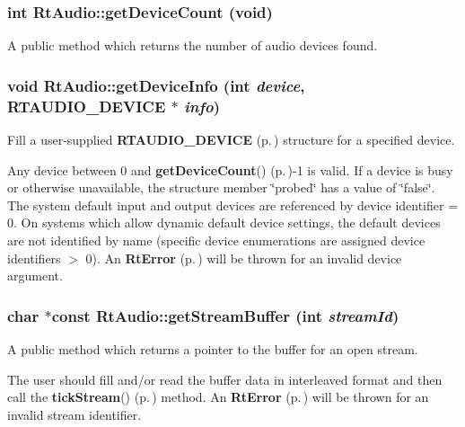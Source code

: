 \subsubsection{\setlength{\rightskip}{0pt plus 5cm}int Rt\-Audio::get\-Device\-Count (void)}\label{classRtAudio_a6}


A public method which returns the number of audio devices found.

\subsubsection{\setlength{\rightskip}{0pt plus 5cm}void Rt\-Audio::get\-Device\-Info (int {\em device}, {\bf RTAUDIO\_\-DEVICE} $\ast$ {\em info})}\label{classRtAudio_a7}


Fill a user-supplied {\bf RTAUDIO\_\-DEVICE} {\rm (p.\,\pageref{structRtAudio_1_1RTAUDIO__DEVICE})} structure for a specified device.

Any device between 0 and {\bf get\-Device\-Count}() {\rm (p.\,\pageref{classRtAudio_a6})}-1 is valid. If a device is busy or otherwise unavailable, the structure member \char`\"{}probed\char`\"{} has a value of \char`\"{}false\char`\"{}. The system default input and output devices are referenced by device identifier = 0. On systems which allow dynamic default device settings, the default devices are not identified by name (specific device enumerations are assigned device identifiers $>$ 0). An {\bf Rt\-Error} {\rm (p.\,\pageref{classRtError})} will be thrown for an invalid device argument. 
\subsubsection{\setlength{\rightskip}{0pt plus 5cm}char $\ast$const Rt\-Audio::get\-Stream\-Buffer (int {\em stream\-Id})}\label{classRtAudio_a8}


A public method which returns a pointer to the buffer for an open stream.

The user should fill and/or read the buffer data in interleaved format and then call the {\bf tick\-Stream}() {\rm (p.\,\pageref{classRtAudio_a9})} method. An {\bf Rt\-Error} {\rm (p.\,\pageref{classRtError})} will be thrown for an invalid stream identifier. 

